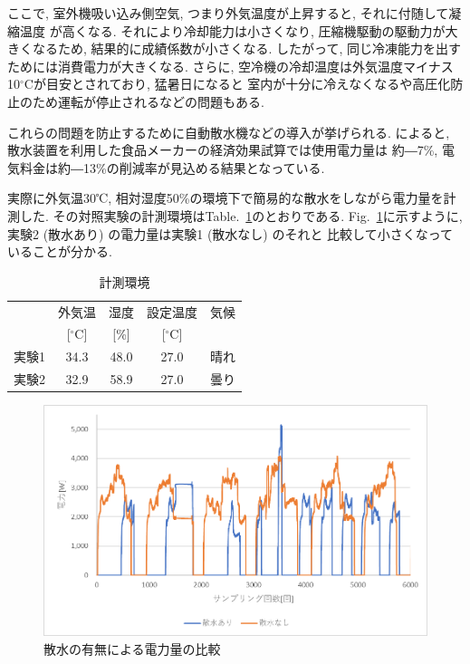 \documentclass[a4j,fleqn,dvipdfmx,uplatex]{jsarticle}
\newcommand{\figref}[1]{Fig.\ \ref{#1}}
\newcommand{\tableref}[1]{Table.\ \ref{#1}}
\begin{document}
ここで, 室外機吸い込み側空気, つまり外気温度が上昇すると, それに付随して凝縮温度
が高くなる. それにより冷却能力は小さくなり, 圧縮機駆動の駆動力が大きくなるため, 
結果的に成績係数が小さくなる. したがって, 同じ冷凍能力を出すためには消費電力が大きくなる.  
さらに, 空冷機の冷却温度は外気温度マイナス10$^\circ$Cが目安とされており, 猛暑日になると
室内が十分に冷えなくなるや高圧化防止のため運転が停止されるなどの問題もある. 

これらの問題を防止するために自動散水機などの導入が挙げられる. 
\cite{thesis3}によると, 散水装置を利用した食品メーカーの経済効果試算では使用電力量は
約―7\%, 電気料金は約―13\%の削減率が見込める結果となっている. 


実際に外気温30℃, 相対湿度50\%の環境下で簡易的な散水をしながら電力量を計測した. 
その対照実験の計測環境は\tableref{table:ex1}のとおりである. 
\figref{fig1:compare_watering}に示すように, 実験2 (散水あり) の電力量は実験1 (散水なし) のそれと
比較して小さくなっていることが分かる.

\begin{table}[htb]
  \caption{計測環境}
  \label{table:ex1}
  \centering
  \begin{tabular}{lcccc}
     & 外気温 & 湿度 & 設定温度 & 気候 \\[-1.5mm]
     & [$^\circ$C] & [\%] & [$^\circ$C] &  \\
    \hline \hline
    実験1 & 34.3 & 48.0 & 27.0 & 晴れ  \\
    実験2 & 32.9 & 58.9 & 27.0 & 曇り \\
    \hline
  \end{tabular}
\end{table}

\begin{figure}[htb]
  \centering
      \includegraphics[width=0.8\linewidth]{img/ex1.png}
      \caption{散水の有無による電力量の比較}
      \label{fig1:compare_watering}
\end{figure}
\end{document}

